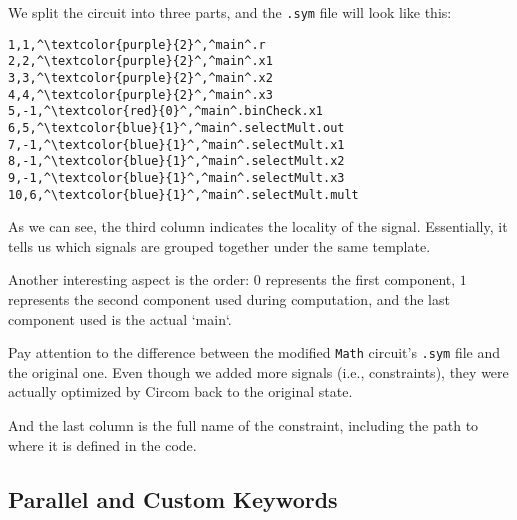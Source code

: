 \documentclass[../lecture-notes-148x210.tex]{subfiles}
\begin{document}
We split the circuit into three parts, and the \texttt{.sym} file will look like this:

\begin{center}
    \begin{tcolorbox}[enhanced,
        width=0.5\textwidth,
        title=\textbf{\footnotesize.sym file for $x_1? \; x_2 \times x_3 : x_2+x_3$ with templates},
        coltitle=gray!25!black,
        attach boxed title to top center={yshift=-2mm,yshifttext=-1mm},
        boxed title style={size=small,colframe=gray!75!black,
        colback=blue!30!white,boxrule=1pt},
        top=-0.35cm,
        bottom=-0.35cm]
        \begin{lstlisting}[language=Circom,numbers=none,basicstyle=\ttfamily\footnotesize,escapechar=^]
1,1,^\textcolor{purple}{2}^,^main^.r
2,2,^\textcolor{purple}{2}^,^main^.x1
3,3,^\textcolor{purple}{2}^,^main^.x2
4,4,^\textcolor{purple}{2}^,^main^.x3
5,-1,^\textcolor{red}{0}^,^main^.binCheck.x1
6,5,^\textcolor{blue}{1}^,^main^.selectMult.out
7,-1,^\textcolor{blue}{1}^,^main^.selectMult.x1
8,-1,^\textcolor{blue}{1}^,^main^.selectMult.x2
9,-1,^\textcolor{blue}{1}^,^main^.selectMult.x3
10,6,^\textcolor{blue}{1}^,^main^.selectMult.mult
        \end{lstlisting}
    \end{tcolorbox}
\end{center}

As we can see, the third column indicates the locality of the signal.
Essentially, it tells us which signals are grouped together under the same template.

Another interesting aspect is the order: $0$ represents the first component, $1$ represents the second component used during computation, and the last component used is the actual `main`.

\begin{remark}
    Pay attention to the difference between the modified \texttt{Math} circuit's \texttt{.sym} file and the original one.
    Even though we added more signals (i.e., constraints), they were actually optimized by Circom back to the original state.
\end{remark}

And the last column is the full name of the constraint, including the path to where it is defined in the code.

\subsection{Parallel and Custom Keywords}
\end{document}
